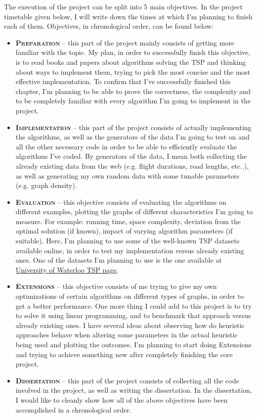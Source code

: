 The execution of the project can be split into 5 main objectives. In the project timetable given below, I will write down the times at which I'm planning to finish each of them. Objectives, in chronological order, can be found below:
\begin{itemize}
    \item \textbf{\textsc{Preparation}} -- this part of the project mainly consists of getting more familiar with the topic. My plan, in order to successfully finish this objective, is to read books and papers about algorithms solving the TSP and thinking about ways to implement them, trying to pick the most concise and the most effective implementation. To confirm that I've successfully finished this chapter, I'm planning to be able to prove the correctness, the complexity and to be completely familiar with every algorithm I'm going to implement in the project.
    \item \textbf{\textsc{Implementation}} -- this part of the project consists of actually implementing the algorithms, as well as the generators of the data I'm going to test on and all the other necessary code in order to be able to efficiently evaluate the algorithms I've coded. By generators of the data, I mean both collecting the already existing data from the web (e.g. flight durations, road lengths, etc..), as well as generating my own random data with some tunable parameters (e.g. graph density).
    \item \textbf{\textsc{Evaluation}} -- this objective consists of evaluating the algorithms on different examples, plotting the graphs of different characteristics I'm going to measure. For example: running time, space complexity, deviation from the optimal solution (if known), impact of varying algorithm parameters (if suitable). Here, I'm planning to use some of the well-known TSP datasets available online, in order to test my implementation versus already existing ones. One of the datasets I'm planning to use is the one available at \href{http://www.math.uwaterloo.ca/tsp/index.html}{University of Waterloo TSP page}.
    \item \textbf{\textsc{Extensions}} -- this objective consists of me trying to give my own optimizations of certain algorithms on different types of graphs, in order to get a better performance. One more thing I could add to this project is to try to solve it using linear programming, and to benchmark that approach versus already existing ones. I have several ideas about observing how do heuristic approaches behave when altering some parameters in the actual heuristic being used and plotting the outcomes. I'm planning to start doing Extensions and trying to achieve something new after completely finishing the core project.
    \item \textbf{\textsc{Dissertation}} -- this part of the project consists of collecting all the code involved in the project, as well as writing the dissertation. In the dissertation, I would like to cleanly show how all of the above objectives have been accomplished in a chronological order.
\end{itemize}

